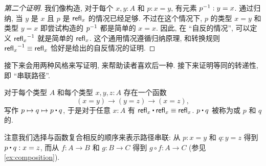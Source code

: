 \begin{proof}[第二个证明]
    我们像构造, 对于每个 $x,y:A$ 和 $p:x=y$, 有元素 $\mathord{{p}^{-1}}:y=x$.
    通过归纳, 当 $y$ 是 $x$ 且 $p$ 是 $\mathsf{refl}_{x}$ 的情况已经足够.
    不过在这个情况下, $p$ 的类型 $x=y$ 和类型 $y=x$ 即尝试构造的 $\mathord{{p}^{-1}}$ 都是简单的 $x=x$.
    因此, 在 ``自反的情况'', 可以定义 $\mathord{{\mathsf{refl}_{x}}^{-1}}$ 就是简单的 $\mathsf{refl}_{x}$.
    这个通用情况遵循归纳原理, 和转换规则 $\mathord{{\mathsf{refl}_{x}}^{-1}}\equiv\mathsf{refl}_{x}$ 恰好是给出的自反情况的证明.
\end{proof}

接下来会用两种风格来写证明, 来帮助读者喜欢后一种. 接下来证明等同的转递性, 即 ``串联路径''.

\begin{lem}
    \label{lem:concat}
    对于每个类型 $A$ 和每个类型 $x,y,z:A$ 存在一个函数
    \begin{equation*}
    (x= y)
        \to (y= z)\to (x= z),
    \end{equation*}
    写作 $p \mapsto q \mapsto p\ct q$, 于是对于任意 $x:A$ 有 $\refl{x}\ct \refl{x}\jdeq \refl{x}$.
    $p\ct q$ 被称为或 $p$ 和 $q$ 的.
\end{lem}

注意我们选择与函数复合相反的顺序来表示路径串联: 从 $p:x=y$ 和 $q:y=z$ 得到 $p\ct q : x=z$, 而从 $f:A\to B$ 和 $g:B\to C$ 得到 $g\circ f : A\to C$ (参见 \cref{ex:composition}).

